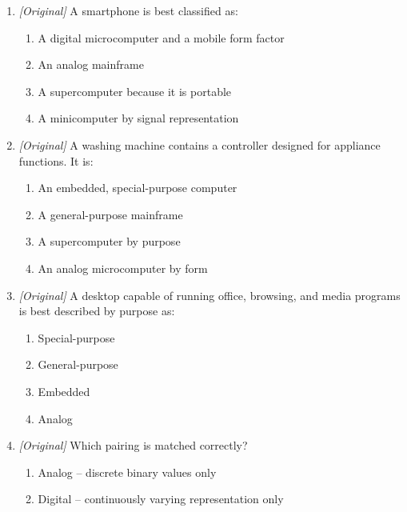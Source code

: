 \documentclass[11pt]{article}
\begin{document}
\begin{enumerate}[label=\textbf{Q\arabic*.}, leftmargin=*]
  \begin{enumerate}[label=\Alph*.]
    \item A laptop can be both digital and a microcomputer.
    \item A desktop label describes a form factor.
    \item Mainframe and supercomputer are distinguished only by cabinet size.
    \item An embedded computer is built into a larger device.
  \end{enumerate}
\item \textit{[Original]} A smartphone is best classified as:
  \begin{enumerate}[label=\Alph*.]
    \item A digital microcomputer and a mobile form factor
    \item An analog mainframe
    \item A supercomputer because it is portable
    \item A minicomputer by signal representation
  \end{enumerate}
\item \textit{[Original]} A washing machine contains a controller designed
  for appliance functions. It is:
  \begin{enumerate}[label=\Alph*.]
    \item An embedded, special-purpose computer
    \item A general-purpose mainframe
    \item A supercomputer by purpose
    \item An analog microcomputer by form
  \end{enumerate}
\item \textit{[Original]} A desktop capable of running office, browsing, and
  media programs is best described by purpose as:
  \begin{enumerate}[label=\Alph*.]
    \item Special-purpose
    \item General-purpose
    \item Embedded
    \item Analog
  \end{enumerate}
\item \textit{[Original]} Which pairing is matched correctly?
  \begin{enumerate}[label=\Alph*.]
    \item Analog -- discrete binary values only
    \item Digital -- continuously varying representation only

\end{enumerate}
\end{enumerate}
\end{document}
